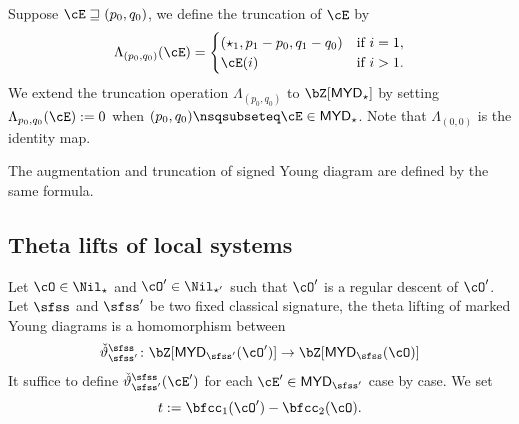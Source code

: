 \documentclass[12pt,a4paper]{amsart}
\def\MYD{{\mathsf{MYD}}}
\def\abs#1{\left|{#1}\right|}
\numberwithin{equation}{section}
\theoremstyle{remark}
\def\lsign{{}^l\mathrm{Sign}}
\begin{document}
Suppose $\cE\sqsupseteq (p_{0},q_{0})$, we define the truncation of $\cE$ by
\[
  \Lambda_{(p_{0},q_{0})}(\cE) = \begin{cases}
    (\star_{1},p_{1}-p_{0},q_{1}-q_{0}) & \text{if } i=1,\\
    \cE(i) & \text{if } i>1.
  \end{cases}
\]
We extend the truncation operation $\Lambda_{( p_{0},q_{0} )}$ to
$\bZ[\MYD_{\star}]$
by setting $\Lambda_{p_{0},q_{0}}(\cE) := 0$ when $(p_{0},q_{0})\nsqsubseteq \cE\in \MYD_{\star}$.
Note that $\Lambda_{(0,0)}$ is the identity map.

The augmentation and truncation of signed Young diagram are defined by the same
formula.

\medskip




\def\cEp{\cE'}
\subsection{Theta lifts of local systems}

Let $\cO\in \Nil_{\star}$ and $\cO'\in \Nil_{\star'}$ such that  $\cO'$ is a
regular descent of $\cO'$.
Let $\sfss$ and $\sfss'$ be two fixed classical signature,
the theta lifting of marked Young diagrams is a homomorphism between
\[
  \dliftv \colon \bZ[\MYD_{\sfss'}(\cO')]\rightarrow \bZ[\MYD_{\sfss}(\cO)]
\]
It suffice to define $\dliftv(\cEp)$ for  each $\cEp\in \MYD_{\sfss'}$ case by case.
We set
\[
  t := \bfcc_{1}(\cO')-\bfcc_{2}(\cO).
\]
\end{document}
